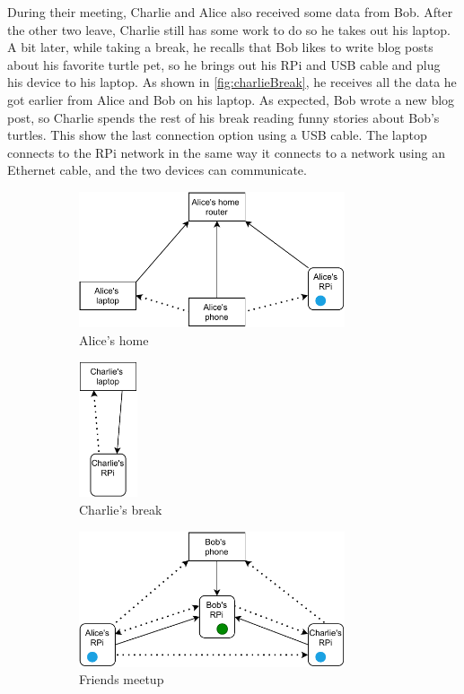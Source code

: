 \documentclass[a4paper,11pt,oneside]{report}
\begin{document}
During their meeting, Charlie and Alice also received some data from Bob. After the other two leave, Charlie still has some work to do so he takes out his laptop. A bit later, while taking a break, he recalls that Bob likes to write blog posts about his favorite turtle pet, so he brings out his RPi and USB cable and plug his device to his laptop. As shown in \autoref{fig:charlieBreak}, he receives all the data he got earlier from Alice and Bob on his laptop. As expected, Bob wrote a new blog post, so Charlie spends the rest of his break reading funny stories about Bob's turtles. This show the last connection option using a USB cable. The laptop connects to the RPi network in the same way it connects to a network using an Ethernet cable, and the two devices can communicate.

\begin{figure}
    \begin{subfigure}{0.5\textwidth}
        \centering
        \includegraphics[height=4cm]{figures/scenarioAliceHome.pdf}
        \caption{Alice's home}
        \label{fig:aliceHome}
    \end{subfigure}%
    \begin{subfigure}{0.5\textwidth}
      \centering
      \includegraphics[height=4cm]{figures/scenarioCharlieBreak.pdf}
      \caption{Charlie's break}
      \label{fig:charlieBreak}
    \end{subfigure}
    \bigbreak
    \begin{subfigure}{\textwidth}
      \centering
      \includegraphics[height=4cm]{figures/scenarioMeeting.pdf}
      \caption{Friends meetup}
      \label{fig:meeting}
    \end{subfigure}
    \caption{}
\end{figure}
\end{document}

